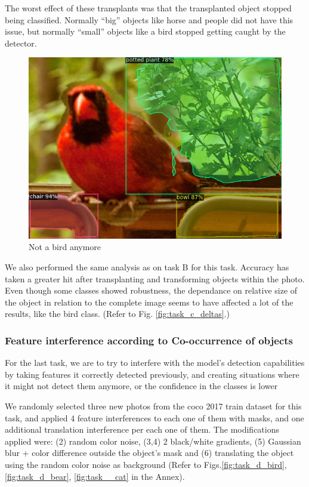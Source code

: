 \documentclass[11pt,a4paper,twocolumn,twoside]{article}
\begin{document}
The worst effect of these transplants was that the transplanted object stopped being classified. Normally “big” objects like horse and people did not have this issue, but normally “small” objects like a bird stopped getting caught by the detector.

\begin{figure}[htb]
    \centering
    \includegraphics[height=0.8\linewidth]{Resources/Images/not_bird.png}
    \caption{Not a bird anymore}
    \label{fig:bird}
    \end{figure}
    
We also performed the same analysis as on task B for this task. Accuracy has taken a greater hit after transplanting and transforming objects within the photo. Even though some classes showed robustness, the dependance on relative size of the object in relation to the complete image seems to have affected a lot of the results, like the bird class. (Refer to Fig. \ref{fig:task_c_deltas}.)


\subsubsection{Feature interference according to Co-occurrence of
objects}

For the last task, we are to try to interfere with the model’s detection capabilities by taking features it correctly detected previously, and creating situations where it might not detect them anymore, or the confidence in the classes is lower

We randomly selected three new photos from the coco 2017 train dataset for this task, and applied 4 feature interferences to each one of them with masks, and one additional translation interference per each one of them. The modifications applied were: (2) random color noise, (3,4) 2 black/white gradients, (5) Gaussian blur + color difference outside the object’s mask and (6) translating the object using the random color noise as background (Refer to Figs.\ref{fig:task_d_bird}, \ref{fig:task_d_bear}, \ref{fig:task__cat} in the Annex).
\end{document}
